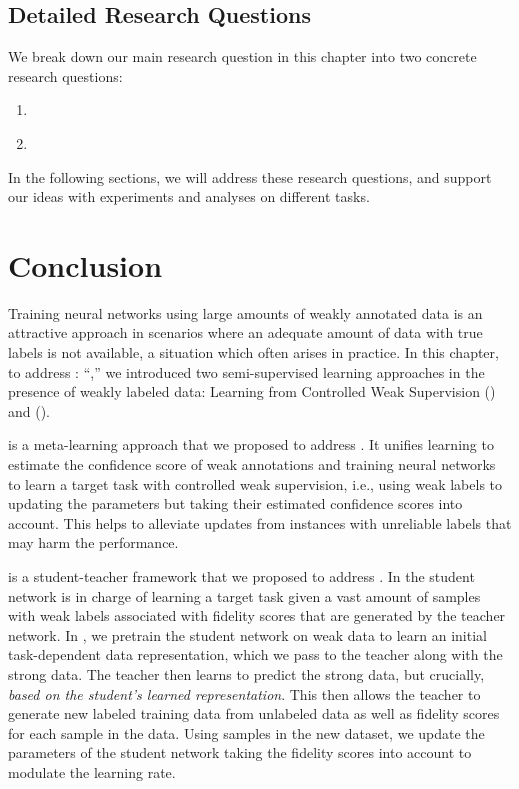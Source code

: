 \subsection{Detailed Research Questions}
We break down our main research question in this chapter into two concrete research questions:
\begin{resqbox}
\begin{enumerate}
\item[\textbf{\resqname{c5.1}}] \emph{}
\item[\textbf{\resqname{c5.2}}] \emph{}
\end{enumerate}
\end{resqbox}
In the following sections, we will address these research questions, and support our ideas with experiments and analyses on different tasks.







\section{Conclusion}
Training neural networks using large amounts of weakly annotated data is an attractive approach in scenarios where an adequate amount of data with true labels is not available, a situation which often arises in practice.
%
In this chapter, to address \textbf{}: ``\emph{},'' we introduced two semi-supervised learning approaches in the presence of weakly labeled data: Learning from Controlled Weak Supervision (\cws) and \fwlfulllc (\fwl).

\cws is a meta-learning approach that we proposed to address \textbf{}. It unifies learning to estimate the confidence score of weak annotations and training neural networks to learn a target task with controlled weak supervision, i.e., using weak labels to updating the parameters but taking their estimated confidence scores into account. This helps to alleviate updates from instances with unreliable labels that may harm the performance.

\fwl is a student-teacher framework that we proposed to address \textbf{}. In \fwl the student network is in charge of learning a target task given a vast amount of samples with weak labels associated with fidelity scores that are generated by the teacher network. In \fwl, we pretrain the student network on weak data to learn an initial task-dependent data representation, which we pass to the teacher along with the strong data. The teacher then learns to predict the strong data, but crucially, \emph{based on the student's learned representation}. This then allows the teacher to generate new labeled training data from unlabeled data as well as fidelity scores for each sample in the data. Using samples in the new dataset, we update the parameters of the student network taking the fidelity scores into account to modulate the learning rate. 

